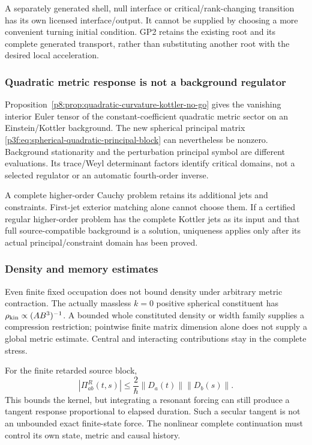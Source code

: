 \documentclass[12pt,a4paper]{article}
\begin{document}
A separately generated shell, null interface or critical/rank-changing
transition has its own licensed interface/output. It cannot be supplied by
choosing a more convenient turning initial condition. GP2 retains the
existing root and its complete generated transport, rather than substituting
another root with the desired local acceleration.

\subsubsection{Quadratic metric response is not a background regulator}
Proposition~\ref{p8:prop:quadratic-curvature-kottler-no-go} gives the
vanishing interior Euler tensor of the constant-coefficient quadratic metric
sector on an Einstein/Kottler background. The new spherical principal matrix
\eqref{p3f:eq:spherical-quadratic-principal-block} can nevertheless be
nonzero. Background stationarity and the perturbation principal symbol are
different evaluations. Its trace/Weyl determinant factors identify critical
domains, not a selected regulator or an automatic fourth-order inverse.

A complete higher-order Cauchy problem retains its additional jets and
constraints. First-jet exterior matching alone cannot choose them. If a
certified regular higher-order problem has the complete Kottler jets as its
input and that full source-compatible background is a solution, uniqueness
applies only after its actual principal/constraint domain has been proved.

\subsubsection{Density and memory estimates}
Even finite fixed occupation does not bound density under arbitrary metric
contraction. The actually massless \(k=0\) positive spherical constituent
has \(\rho_{\rm kin}\propto(AB^3)^{-1}\). A bounded whole constituted
density or width family supplies a compression restriction; pointwise
finite matrix dimension alone does not supply a global metric estimate.
Central and interacting contributions stay in the complete stress.

For the finite retarded source block,
\[
 |\Pi^R_{ab}(t,s)|\leq\frac2\hbar\|D_a(t)\|\|D_b(s)\|.
\]
This bounds the kernel, but integrating a resonant forcing can still produce
a tangent response proportional to elapsed duration. Such a secular tangent
is not an unbounded exact finite-state force. The nonlinear complete
continuation must control its own state, metric and causal history.
\end{document}
